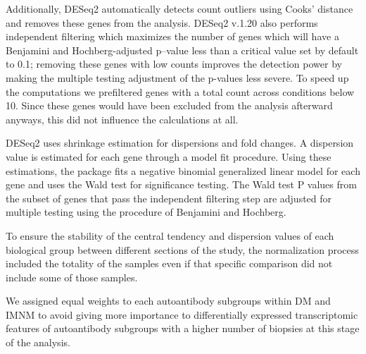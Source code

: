 Additionally, DESeq2 automatically detects count outliers using Cooks' distance and removes these genes from the analysis. DESeq2 v.1.20 also performs independent filtering which maximizes the number of genes which will have a Benjamini and Hochberg-adjusted p–value less than a critical value set by default to 0.1; removing these genes with low counts improves the detection power by making the multiple testing adjustment of the p-values less severe. To speed up the computations we prefiltered genes with a total count across conditions below 10. Since these genes would have been excluded from the analysis afterward anyways, this did not influence the calculations at all.

DESeq2 uses shrinkage estimation for dispersions and fold changes. A dispersion value is estimated for each gene through a model fit procedure. Using these estimations, the package fits a negative binomial generalized linear model for each gene and uses the Wald test for significance testing. The Wald test P values from the subset of genes that pass the independent filtering step are adjusted for multiple testing using the procedure of Benjamini and Hochberg.\cite{Benjamini1995}

To ensure the stability of the central tendency and dispersion values of each biological group between different sections of the study, the normalization process included the totality of the samples even if that specific comparison did not include some of those samples.

We assigned equal weights to each autoantibody subgroups within DM and IMNM to avoid giving more importance to differentially expressed transcriptomic features of autoantibody subgroups with a higher number of biopsies at this stage of the analysis.

